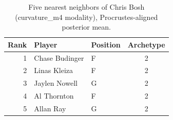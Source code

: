 \begin{table}[htbp]
  \centering\small
  \begin{tabular}{rllc}
    \toprule
    Rank & Player & Position & Archetype \\
    \midrule
    1 & Chase Budinger & F & 2 \\
    2 & Linas Kleiza & F & 2 \\
    3 & Jaylen Nowell & G & 2 \\
    4 & Al Thornton & F & 2 \\
    5 & Allan Ray & G & 2 \\
    \bottomrule
  \end{tabular}
  \caption{Five nearest neighbors of Chris Bosh (curvature_m4 modality), Procrustes-aligned posterior mean.}
  \label{tab:Chris_Bosh_neighbors_curvature_m4}
\end{table}

